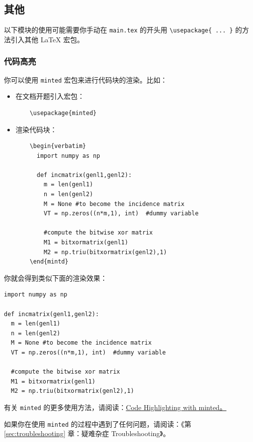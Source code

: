 \subsection{其他}

以下模块的使用可能需要你手动在 \texttt{main.tex} 的开头用 \verb|\usepackage{ ... }| 的方法引入其他 {\LaTeX} 宏包。

\subsubsection{代码高亮}

你可以使用 \texttt{minted} 宏包来进行代码块的渲染。比如：

\begin{itemize}
  \item 在文档开题引入宏包：
  \begin{verbatim}
    \usepackage{minted}
  \end{verbatim}
  \item 渲染代码块：
  \begin{verbatim}
    \begin{verbatim}
      import numpy as np

      def incmatrix(genl1,genl2):
        m = len(genl1)
        n = len(genl2)
        M = None #to become the incidence matrix
        VT = np.zeros((n*m,1), int)  #dummy variable

        #compute the bitwise xor matrix
        M1 = bitxormatrix(genl1)
        M2 = np.triu(bitxormatrix(genl2),1)
    \end{mintd}
  \end{verbatim}
\end{itemize}

你就会得到类似下面的渲染效果：

\begin{verbatim}
import numpy as np

def incmatrix(genl1,genl2):
  m = len(genl1)
  n = len(genl2)
  M = None #to become the incidence matrix
  VT = np.zeros((n*m,1), int)  #dummy variable

  #compute the bitwise xor matrix
  M1 = bitxormatrix(genl1)
  M2 = np.triu(bitxormatrix(genl2),1)
\end{verbatim}

有关 \texttt{minted} 的更多使用方法，请阅读：\href{https://www.overleaf.com/learn/latex/Code_Highlighting_with_minted}{Code Highlighting with minted。}

如果你在使用 \texttt{minted} 的过程中遇到了任何问题，请阅读：《第 \ref{sec:troubleshooting} 章：疑难杂症 Troubleshooting》。

